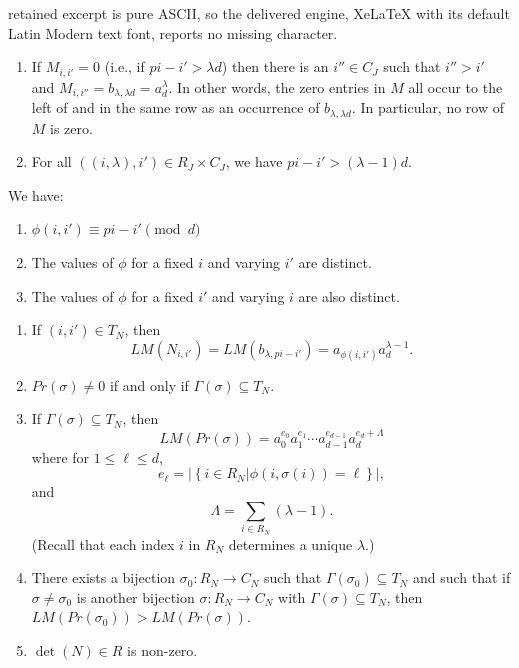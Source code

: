 \documentclass[10pt,a4paper]{amsart}
\begin{document}
retained excerpt is pure ASCII, so the delivered engine, XeLaTeX with its default Latin Modern text font, reports no missing character.
\begin{prop}\label{prop:M-props}\mbox{}
  \begin{enumerate}
  \item If $M_{i,i'}=0$ \textup{(}i.e., if $pi-i'>\lambda d$\textup{)}
    then there is an $i''\in C_J$ such that $i''>i'$ and
    $M_{i,i''}=b_{\lambda,\lambda d}=a_d^\lambda$.
    In other words, the zero entries in $M$ all occur to the left of and
    in the same row as an occurrence of $b_{\lambda,\lambda d}$.  In
    particular, no row of $M$ is zero.
  \item  For all $((i,\lambda),i')\in R_J\times C_J$, we have $pi-i'>(\lambda-1)d$.
  \end{enumerate}
\end{prop}

\begin{prop}\label{prop:phi}
  We have:
  \begin{enumerate}
  \item $\phi(i,i')\equiv pi-i'\pmod d$
  \item The values of $\phi$ for a fixed $i$ and varying $i'$ are
    distinct.
  \item The values of $\phi$ for a fixed $i'$ and varying $i$ are also
    distinct.
  \end{enumerate}
\end{prop}

\begin{thm}\label{thm:det}\mbox{}
  \begin{enumerate}
  \item If $(i,i')\in T_N$, then
\[LM(N_{i,i'})=LM(b_{\lambda,pi-i'})=a_{\phi(i,i')}a_d^{\lambda-1}.\]
\item $Pr(\sigma)\ne0$ if and only if $\Gamma(\sigma)\subseteq T_N$.
\item If $\Gamma(\sigma)\subseteq T_N$, then
  \[LM(Pr(\sigma))=a_0^{e_0}a_1^{e_1}\cdots
    a_{d-1}^{e_{d-1}}a_d^{e_d+\Lambda}\]
  where for $1\le\ell\le d$,
  \[e_\ell=\left|\left\{i\in R_N|\phi(i,\sigma(i))=\ell\right\}\right|,\]
  and
  \[\Lambda=\sum_{i\in R_N}(\lambda-1).\]
  \textup{(}Recall that each index $i$ in $R_N$ determines a unique
  $\lambda$.\textup{)}
\item There exists a bijection $\sigma_0:R_N\to C_N$ such that
  $\Gamma(\sigma_0)\subseteq T_N$ and such that if
  $\sigma\neq\sigma_0$ is another bijection $\sigma:R_N\to C_N$ with
  $\Gamma(\sigma)\subseteq T_N$, then
  $LM(Pr(\sigma_0))>LM(Pr(\sigma))$.
\item $\det(N)\in R$ is non-zero.
  \end{enumerate}
\end{thm}
\end{document}
